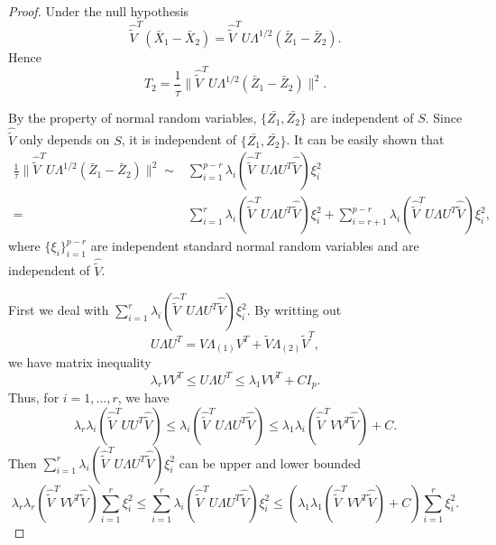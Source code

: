 \begin{proof}


    Under the null hypothesis
    $$
    \hat{\tilde{V}}^T (\bar{X}_1-\bar{X}_2)=\hat{\tilde{V}}^T U \Lambda^{1/2}(\bar{Z}_1-\bar{Z}_2).
    $$
    Hence
    $$
    T_2=\frac{1}{\tau}\|\hat{\tilde{V}}^T U \Lambda^{1/2}(\bar{Z}_1-\bar{Z}_2)\|^2.
    $$

    By the property of normal random variables, $\{\bar{Z_1},\bar{Z_2}\}$ are independent of $S$.
    Since $\hat{\tilde{V}}$ only depends on $S$, it is independent of $\{\bar{Z_1},\bar{Z_2}\}$.
    It can be easily shown that
    \begin{equation}\label{nullTheorem:twoTerms}
    \begin{split}
        \frac{1}{\tau}\|\hat{\tilde{V}}^T U \Lambda^{1/2}(\bar{Z}_1-\bar{Z}_2)\|^2\sim&
    \sum_{i=1}^{p-r} \lambda_i (\hat{\tilde{V}}^T U \Lambda U^T \hat{\tilde{V}}) \xi_i^2\\
        =&
         \sum_{i=1}^{r} \lambda_i (\hat{\tilde{V}}^T U \Lambda U^T \hat{\tilde{V}}) \xi_i^2
    +
     \sum_{i=r+1}^{p-r} \lambda_i (\hat{\tilde{V}}^T U \Lambda U^T \hat{\tilde{V}}) \xi_i^2
    ,
    \end{split}
    \end{equation}
    where $\{\xi_{i}\}_{i=1}^{p-r}$ are independent standard normal random variables and are independent of $\hat{\tilde{V}}$.


    First we deal with 
        $\sum_{i=1}^{r} \lambda_i (\hat{\tilde{V}}^T U \Lambda U^T \hat{\tilde{V}}) \xi_i^2$.
    By writting out
    $$
    U\Lambda U^T
    =
    V\Lambda_{(1)}V^T+
    \tilde{V}\Lambda_{(2)}\tilde{V}^T,
    $$
    we have matrix inequality
    $$
    \lambda_r VV^T 
    \leq
    U\Lambda U^T
    \leq \lambda_1 VV^T +CI_p.
    $$
    Thus, for $i= 1,\ldots,r$, we have
    $$
    \lambda_r \lambda_i(\hat{\tilde{V}}^T U U^T \hat{\tilde{V}})
    \leq
    \lambda_i(\hat{\tilde{V}}^T U\Lambda U^T \hat{\tilde{V}})
    \leq
    \lambda_1 \lambda_i(\hat{\tilde{V}}^T V V^T \hat{\tilde{V}})+C.
    $$
Then $
    \sum_{i=1}^{r} \lambda_i (\hat{\tilde{V}}^T U \Lambda U^T \hat{\tilde{V}}) \xi_i^2
    $
    can be upper and lower bounded
$$
    \lambda_r \lambda_r(\hat{\tilde{V}}^T V V^T \hat{\tilde{V}})
    \sum_{i=1}^{r} 
    \xi_i^2
\leq
    \sum_{i=1}^{r} \lambda_i (\hat{\tilde{V}}^T U \Lambda U^T \hat{\tilde{V}}) \xi_i^2
    \leq
    (\lambda_1 \lambda_1(\hat{\tilde{V}}^T V V^T \hat{\tilde{V}})+C)
    \sum_{i=1}^{r} 
    \xi_i^2.
$$



\end{proof}
